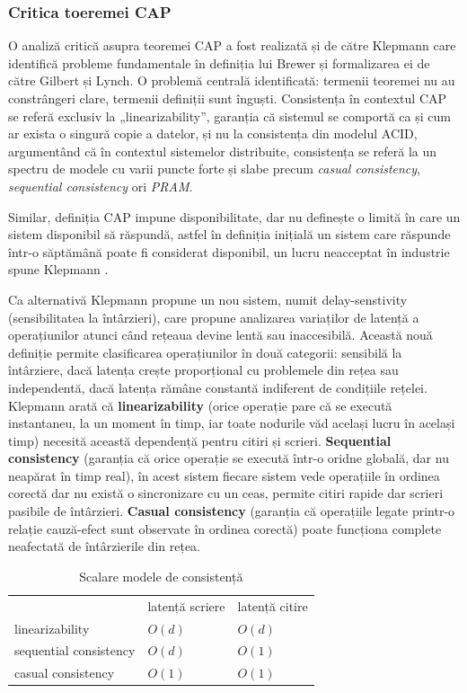 \subsubsection{Critica toeremei CAP} 
O analiză critică asupra teoremei CAP a fost realizată și de către Klepmann\cite{kleppmann_critique_2015} care identifică probleme fundamentale în definiția lui Brewer și formalizarea ei de către Gilbert și Lynch. O problemă centrală identificată: termenii teoremei nu au constrângeri clare, termenii definiții sunt înguști. Consistența în contextul CAP se referă exclusiv la „linearizability”, garanția că sistemul se comportă ca și cum ar exista o singură copie a datelor, și nu la consistența din modelul ACID, argumentând că în contextul sistemelor distribuite, consistența se referă la un spectru de modele cu varii puncte forte și slabe precum \textit{casual consistency}, \textit{sequential consistency} ori \textit{PRAM}.

Similar, definiția CAP impune disponibilitate, dar nu definește o limită în care un sistem disponibil să răspundă, astfel în definiția inițială un sistem care răspunde într-o săptămână poate fi considerat disponibil, un lucru neacceptat în industrie spune Klepmann \cite{kleppmann_critique_2015}.

Ca alternativă Klepmann propune un nou sistem, numit delay-senstivity (sensibilitatea la întârzieri), care propune analizarea variaților de latență a operațiunilor atunci când rețeaua devine lentă sau inaccesibilă. Această nouă definiție permite clasificarea operațiunilor în două categorii: sensibilă la întârziere, dacă latența crește proporțional cu problemele din rețea sau independentă, dacă latența rămâne constantă indiferent de condițiile rețelei. Klepmann \cite{kleppmann_critique_2015} arată că \textbf{linearizability} (orice operație pare că se execută instantaneu, la un moment în timp, iar toate nodurile văd același lucru în același timp) necesită această dependență pentru citiri și scrieri. \textbf{Sequential consistency} (garanția că orice operație se execută într-o oridne globală, dar nu neapărat în timp real), în acest sistem fiecare sistem vede operațiile în ordinea corectă dar nu există o sincronizare cu un ceas, permite citiri rapide dar scrieri pasibile de întârzieri. \textbf{Casual consistency} (garanția că operațiile legate printr-o relație cauză-efect sunt observate în ordinea corectă) poate funcționa complete neafectată de întârzierile din rețea.

\begin{table}[h]
\centering
\begin{tabular}{lll}
\multicolumn{1}{c}{}   & \multicolumn{1}{c}{latență scriere} & latență citire \\
linearizability        & $O(d)$                              & $O(d)$         \\
sequential consistency & $O(d)$                              & $O(1)$         \\
casual consistency     & $O(1)$                              & $O(1)$         \\
\end{tabular}
\caption{Scalare modele de consistență}
\end{table}

